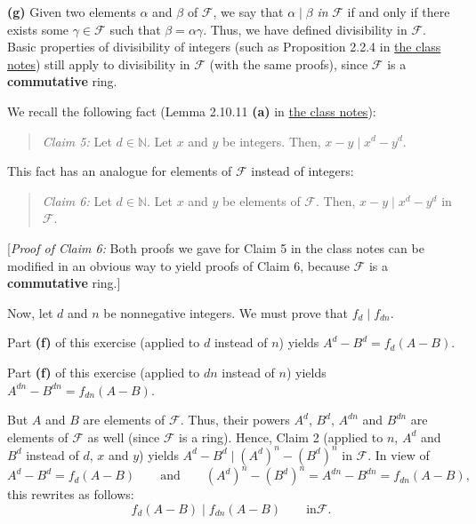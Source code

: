 \documentclass[paper=a4, fontsize=12pt]{scrartcl}%
\theoremstyle{plainsl}
\theoremstyle{definition}
\theoremstyle{remark}
\newenvironment{statement}{\begin{quote}}{\end{quote}}
\begin{document}
\bigskip

\textbf{(g)} Given two elements $\alpha$ and $\beta$ of $\mathcal{F}$, we say
that $\alpha\mid\beta$ \textit{in }$\mathcal{F}$ if and only if there exists
some $\gamma\in\mathcal{F}$ such that $\beta=\alpha\gamma$. Thus, we have
defined divisibility in $\mathcal{F}$. Basic properties of divisibility of
integers (such as Proposition 2.2.4 in
\href{http://www.cip.ifi.lmu.de/~grinberg/t/19s/notes.pdf}{the class notes})
still apply to divisibility in $\mathcal{F}$ (with the same proofs), since
$\mathcal{F}$ is a \textbf{commutative} ring.

We recall the following fact (Lemma 2.10.11 \textbf{(a)} in
\href{http://www.cip.ifi.lmu.de/~grinberg/t/19s/notes.pdf}{the class notes}):

\begin{statement}
\textit{Claim 5:} Let $d\in\mathbb{N}$. Let $x$ and $y$ be integers. Then,
$x-y\mid x^{d}-y^{d}$.
\end{statement}

This fact has an analogue for elements of $\mathcal{F}$ instead of integers:

\begin{statement}
\textit{Claim 6:} Let $d\in\mathbb{N}$. Let $x$ and $y$ be elements of
$\mathcal{F}$. Then, $x-y\mid x^{d}-y^{d}$ in $\mathcal{F}$.
\end{statement}

[\textit{Proof of Claim 6:} Both proofs we gave for Claim 5 in the class notes
can be modified in an obvious way to yield proofs of Claim 6, because
$\mathcal{F}$ is a \textbf{commutative} ring.]

Now, let $d$ and $n$ be nonnegative integers. We must prove that $f_{d}\mid
f_{dn}$.

Part \textbf{(f)} of this exercise (applied to $d$ instead of $n$) yields
$A^{d}-B^{d}=f_{d}\left(  A-B\right)  $.

Part \textbf{(f)} of this exercise (applied to $dn$ instead of $n$) yields
$A^{dn}-B^{dn}=f_{dn}\left(  A-B\right)  $.

But $A$ and $B$ are elements of $\mathcal{F}$. Thus, their powers $A^{d}$,
$B^{d}$, $A^{dn}$ and $B^{dn}$ are elements of $\mathcal{F}$ as well (since
$\mathcal{F}$ is a ring). Hence, Claim 2 (applied to $n$, $A^{d}$ and $B^{d}$
instead of $d$, $x$ and $y$) yields $A^{d}-B^{d}\mid\left(  A^{d}\right)
^{n}-\left(  B^{d}\right)  ^{n}$ in $\mathcal{F}$. In view of
\[
A^{d}-B^{d}=f_{d}\left(  A-B\right)  \qquad\text{and}\qquad\left(
A^{d}\right)  ^{n}-\left(  B^{d}\right)  ^{n}=A^{dn}-B^{dn}=f_{dn}\left(
A-B\right)  ,
\]
this rewrites as follows:%
\[
f_{d}\left(  A-B\right)  \mid f_{dn}\left(  A-B\right)  \qquad\text{in
}\mathcal{F}.
\]
\end{document}
